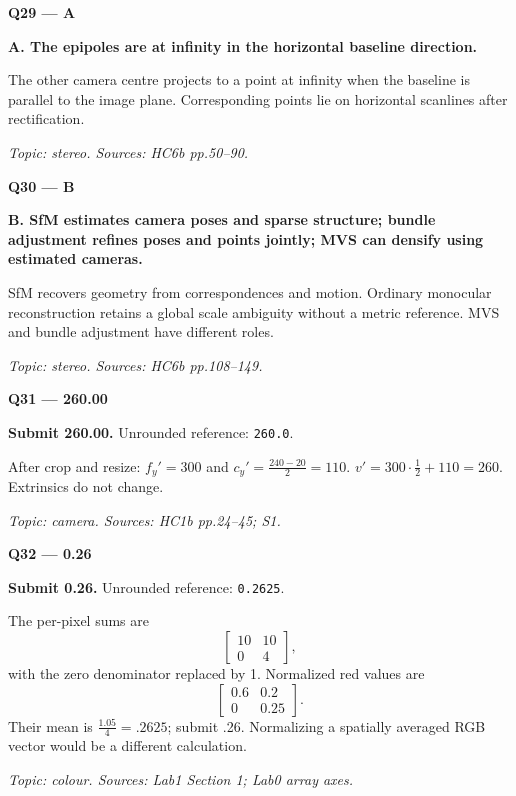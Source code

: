 \documentclass[11pt,a4paper]{article}
\begin{document}
\par\vspace{12pt}
\begin{minipage}{\linewidth}
\textbf{Q29 — A}\par\smallskip
\textbf{A. The epipoles are at infinity in the horizontal baseline direction.}\par
The other camera centre projects to a point at infinity when the baseline is parallel to the image plane. Corresponding points lie on horizontal scanlines after rectification.\par
{\small\itshape Topic: stereo. Sources: HC6b pp.50–90.}

\end{minipage}
\par\vspace{12pt}
\begin{minipage}{\linewidth}
\textbf{Q30 — B}\par\smallskip
\textbf{B. SfM estimates camera poses and sparse structure; bundle adjustment refines poses and points jointly; MVS can densify using estimated cameras.}\par
SfM recovers geometry from correspondences and motion. Ordinary monocular reconstruction retains a global scale ambiguity without a metric reference. MVS and bundle adjustment have different roles.\par
{\small\itshape Topic: stereo. Sources: HC6b pp.108–149.}

\end{minipage}
\par\vspace{12pt}
\begin{minipage}{\linewidth}
\textbf{Q31 — 260.00}\par\smallskip
\textbf{Submit 260.00.} Unrounded reference: \texttt{260.0}.\par
After crop and resize: \(f_y'=300\) and \(c_y'=\frac{240-20}{2}=110\). \(v'=300\cdot\frac{1}{2}+110=260\). Extrinsics do not change.\par
{\small\itshape Topic: camera. Sources: HC1b pp.24–45; S1.}

\end{minipage}
\par\vspace{12pt}
\begin{minipage}{\linewidth}
\textbf{Q32 — 0.26}\par\smallskip
\textbf{Submit 0.26.} Unrounded reference: \texttt{0.2625}.\par
The per-pixel sums are
\[\begin{bmatrix}10&10\\0&4\end{bmatrix},\]
 with the zero denominator replaced by 1. Normalized red values are
\[\begin{bmatrix}0.6&0.2\\0&0.25\end{bmatrix}.\]
 Their mean is \(\frac{1.05}{4}=.2625\); submit .26. Normalizing a spatially averaged RGB vector would be a different calculation.\par
{\small\itshape Topic: colour. Sources: Lab1 Section 1; Lab0 array axes.}

\end{minipage}
\end{document}
